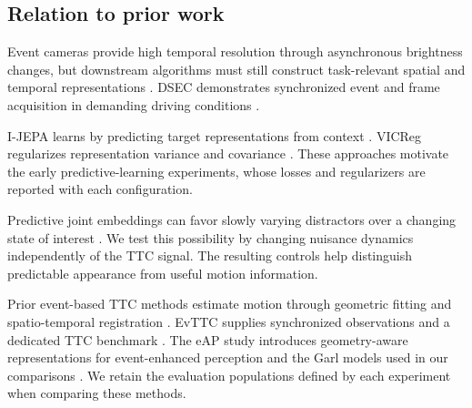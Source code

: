 \subsection{Relation to prior work}
Event cameras provide high temporal resolution through asynchronous brightness changes, but downstream algorithms must still construct task-relevant spatial and temporal representations \citep{eventsurvey}. DSEC demonstrates synchronized event and frame acquisition in demanding driving conditions \citep{dsec}.

I-JEPA learns by predicting target representations from context \citep{ijepa}. VICReg regularizes representation variance and covariance \citep{vicreg}. These approaches motivate the early predictive-learning experiments, whose losses and regularizers are reported with each configuration.

Predictive joint embeddings can favor slowly varying distractors over a changing state of interest \citep{slowfeatures}. We test this possibility by changing nuisance dynamics independently of the TTC signal. The resulting controls help distinguish predictable appearance from useful motion information.

Prior event-based TTC methods estimate motion through geometric fitting and spatio-temporal registration \citep{eventaided}. EvTTC supplies synchronized observations and a dedicated TTC benchmark \citep{evttc}. The eAP study introduces geometry-aware representations for event-enhanced perception and the Garl models used in our comparisons \citep{eap}. We retain the evaluation populations defined by each experiment when comparing these methods. 


